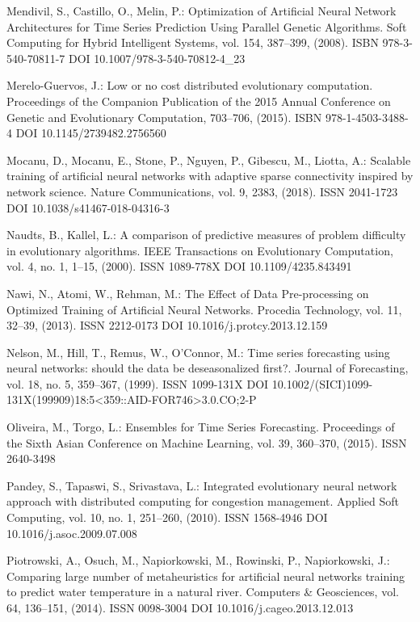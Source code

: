 \begin{thebibliography}{99.}
 Mendivil, S., Castillo, O., Melin, P.: Optimization of Artificial Neural Network Architectures for Time Series Prediction Using Parallel Genetic Algorithms. Soft Computing for Hybrid Intelligent Systems, vol. 154, 387--399, (2008). ISBN 978-3-540-70811-7 DOI 10.1007/978-3-540-70812-4\_23

 Merelo-Guervos, J.: Low or no cost distributed evolutionary computation. Proceedings of the Companion Publication of the 2015 Annual Conference on Genetic and Evolutionary Computation, 703--706, (2015). ISBN 978-1-4503-3488-4 DOI 10.1145/2739482.2756560

 Mocanu, D., Mocanu, E., Stone, P., Nguyen, P., Gibescu, M., Liotta, A.: Scalable training of artificial neural networks with adaptive sparse connectivity inspired by network science. Nature Communications, vol. 9, 2383, (2018). ISSN 2041-1723 DOI 10.1038/s41467-018-04316-3

 Naudts, B., Kallel, L.: A comparison of predictive measures of problem difficulty in evolutionary algorithms. IEEE Transactions on Evolutionary Computation, vol. 4, no. 1, 1--15, (2000). ISSN 1089-778X DOI 10.1109/4235.843491

 Nawi, N., Atomi, W., Rehman, M.: The Effect of Data Pre-processing on Optimized Training of Artificial Neural Networks. Procedia Technology, vol. 11, 32--39, (2013). ISSN 2212-0173 DOI 10.1016/j.protcy.2013.12.159

 Nelson, M., Hill, T., Remus, W., O'Connor, M.: Time series forecasting using neural networks: should the data be deseasonalized first?. Journal of Forecasting, vol. 18, no. 5, 359--367, (1999). ISSN 1099-131X DOI 10.1002/(SICI)1099-131X(199909)18:5<359::AID-FOR746>3.0.CO;2-P

 Oliveira, M., Torgo, L.: Ensembles for Time Series Forecasting. Proceedings of the Sixth Asian Conference on Machine Learning, vol. 39, 360--370, (2015). ISSN 2640-3498

 Pandey, S., Tapaswi, S., Srivastava, L.: Integrated evolutionary neural network approach with distributed computing for congestion management. Applied Soft Computing, vol. 10, no. 1, 251--260, (2010). ISSN 1568-4946 DOI 10.1016/j.asoc.2009.07.008

 Piotrowski, A., Osuch, M., Napiorkowski, M., Rowinski, P., Napiorkowski, J.: Comparing large number of metaheuristics for artificial neural networks training to predict water temperature in a natural river. Computers \& Geosciences, vol. 64, 136--151, (2014). ISSN 0098-3004 DOI 10.1016/j.cageo.2013.12.013


\end{thebibliography}
